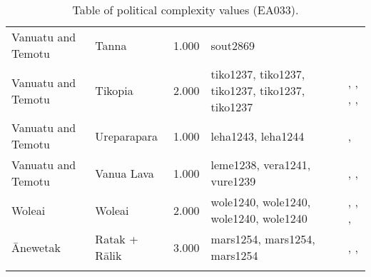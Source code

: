 \begin{longtable}{p{1.8cm}p{1.8cm}p{1.8cm}p{2cm}p{7cm}}
  Vanuatu and Temotu & Tanna & 1.000 & sout2869 & \citet{lindstroem1991} \\ 
  Vanuatu and Temotu & Tikopia & 2.000 & tiko1237, tiko1237, tiko1237, tiko1237, tiko1237 & \citet{kirch1994wet}, \citet{sahlins1958social}, \citet{firth1939primitive}, \citet{firth1959social}, \citet{firth1991} \\ 
  Vanuatu and Temotu & Ureparapara & 1.000 & leha1243, leha1244 & \citet{bonnemaison1996power}, \citet{bonnemaison1996power} \\ 
  Vanuatu and Temotu & Vanua Lava & 1.000 & leme1238, vera1241, vure1239 & \citet{bonnemaison1996power}, \citet{bonnemaison1996power}, \citet{bonnemaison1996power} \\ 
  Woleai & Woleai & 2.000 & wole1240, wole1240, wole1240, wole1240 & \citet{alkire1991woleai}, \citet{alkire1991woleai}, \citet{burrowsandspiro1953}, \citet{burrowsandspiro1953} \\ 
  Ānewetak & Ratak + Rālik & 3.000 & mars1254, mars1254, mars1254 & \citet{carruci1991marshall}, \citet{erdland1914}, \citet{williamson_1982} \\ 
   \bottomrule
\caption{Table of political complexity values (EA033).} 
\label{appendix_pol_complex_xtable}
\end{longtable}
